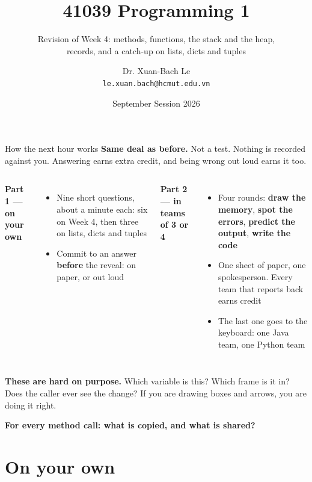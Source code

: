 \documentclass[aspectratio=169]{beamer}
\title[41039 Programming 1 --- Revision of Week 4]{41039 Programming 1}
\subtitle{Revision of Week 4: methods, functions, the stack and the heap,\\
  records, and a catch-up on lists, dicts and tuples}
\author{Dr. Xuan-Bach Le\\ \small\texttt{le.xuan.bach@hcmut.edu.vn}}
\institute{\small Faculty of Computer Science and Engineering, HCMUT}
\date{September Session 2026}
\newcommand{\keyline}[1]{\vfill\begin{center}\textcolor{bkblue}{\textbf{#1}}\end{center}\vspace*{0.2em}}
\newcommand{\hd}[1]{\textbf{#1}}
\newcommand{\neutrallabel}[1]{\textcolor{bkblue}{\textbf{#1}}}
\begin{document}
\begin{frame}[plain]
  \titlepage
\end{frame}

\begin{frame}{How the next hour works}
  \hd{Same deal as before.} Not a test. Nothing is recorded against you. Answering earns
  extra credit, and being wrong out loud earns it too.
  \vspace{0.5em}
  \begin{columns}[T,onlytextwidth]
    \neutrallabel{Part 1 --- on your own}
    \begin{itemize}[itemsep=0.2em]
      \small
      \item Nine short questions, about a minute each: six on Week 4, then three on
        lists, dicts and tuples
      \item Commit to an answer \textbf{before} the reveal: on paper, or out loud
    \end{itemize}
    \neutrallabel{Part 2 --- in teams of 3 or 4}
    \begin{itemize}[itemsep=0.2em]
      \small
      \item Four rounds: \textbf{draw the memory}, \textbf{spot the errors},
        \textbf{predict the output}, \textbf{write the code}
      \item One sheet of paper, one spokesperson. Every team that reports back earns credit
      \item The last one goes to the keyboard: one Java team, one Python team
    \end{itemize}
  \end{columns}
  \vspace{0.4em}
  \hd{These are hard on purpose.} Which variable is this? Which frame is it in? Does the
  caller ever see the change? If you are drawing boxes and arrows, you are doing it right.
  \keyline{For every method call: what is copied, and what is shared?}
\end{frame}

\section{On your own}
\end{document}
